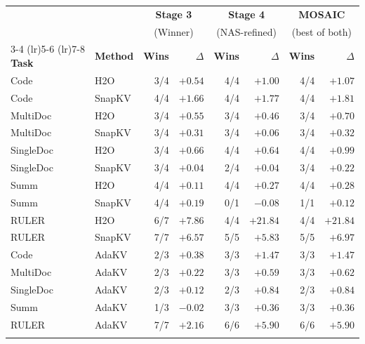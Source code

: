\begin{tabular}{@{} l l r r r r r r @{}}
  \toprule
  & & \multicolumn{2}{c}{\textbf{Stage 3}} & \multicolumn{2}{c}{\textbf{Stage 4}} & \multicolumn{2}{c}{\textbf{MOSAIC}} \\
  & & \multicolumn{2}{c}{(Winner)} & \multicolumn{2}{c}{(NAS-refined)} & \multicolumn{2}{c}{(best of both)} \\
  \cmidrule(lr){3-4} \cmidrule(lr){5-6} \cmidrule(lr){7-8}
  \textbf{Task} & \textbf{Method} & \textbf{Wins} & \textbf{$\Delta$} & \textbf{Wins} & \textbf{$\Delta$} & \textbf{Wins} & \textbf{$\Delta$} \\
  \midrule
  \rowcolor{gray!10}
  Code      & H2O    & 3/4 & $+0.54$ & 4/4 & $+1.00$ & 4/4 & $+1.07$ \\
  Code      & SnapKV & 4/4 & $+1.66$ & 4/4 & $+1.77$ & 4/4 & $+1.81$ \\
  \rowcolor{gray!10}
  MultiDoc  & H2O    & 3/4 & $+0.55$ & 3/4 & $+0.46$ & 3/4 & $+0.70$ \\
  MultiDoc  & SnapKV & 3/4 & $+0.31$ & 3/4 & $+0.06$ & 3/4 & $+0.32$ \\
  \rowcolor{gray!10}
  SingleDoc & H2O    & 3/4 & $+0.66$ & 4/4 & $+0.64$ & 4/4 & $+0.99$ \\
  SingleDoc & SnapKV & 3/4 & $+0.04$ & 2/4 & $+0.04$ & 3/4 & $+0.22$ \\
  \rowcolor{gray!10}
  Summ      & H2O    & 4/4 & $+0.11$ & 4/4 & $+0.27$ & 4/4 & $+0.28$ \\
  Summ      & SnapKV & 4/4 & $+0.19$ & 0/1 & $-0.08$ & 1/1 & $+0.12$ \\
  \rowcolor{gray!10}
  RULER     & H2O    & 6/7 & $+7.86$ & 4/4 & $+21.84$ & 4/4 & $+21.84$ \\
  RULER     & SnapKV & 7/7 & $+6.57$ & 5/5 & $+5.83$ & 5/5 & $+6.97$ \\
  \midrule
  \rowcolor{gray!10}
  Code      & AdaKV  & 2/3 & $+0.38$ & 3/3 & $+1.47$ & 3/3 & $+1.47$ \\
  MultiDoc  & AdaKV  & 2/3 & $+0.22$ & 3/3 & $+0.59$ & 3/3 & $+0.62$ \\
  \rowcolor{gray!10}
  SingleDoc & AdaKV  & 2/3 & $+0.12$ & 2/3 & $+0.84$ & 2/3 & $+0.84$ \\
  Summ      & AdaKV  & 1/3 & $-0.02$ & 3/3 & $+0.36$ & 3/3 & $+0.36$ \\
  \rowcolor{gray!10}
  RULER     & AdaKV  & 7/7 & $+2.16$ & 6/6 & $+5.90$ & 6/6 & $+5.90$ \\
  \midrule
  \rowcolor{gray!10}

\end{tabular}
